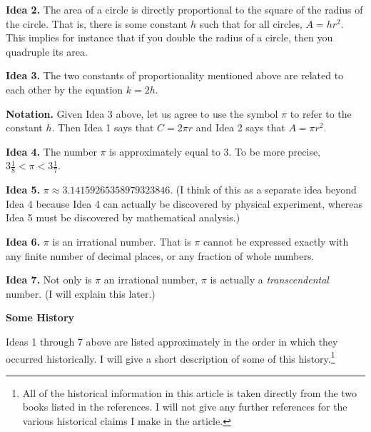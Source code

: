 \documentclass[twoside,twocolumn,12pt]{amsart}
\theoremstyle{plain}
\theoremstyle{definition}
\newcommand{\skipsmall}{\vspace{1em}}
\begin{document}
\vspace{0.1in}

\noindent
\textbf{Idea 2.} The area of a circle is directly proportional to the square
of the radius of the circle. That is, there is some constant $h$ such
that for all circles,
$A=h r^2$.  This implies for instance that if you double the radius
of a circle, then you quadruple its area.

\vspace{0.1in}

\noindent
\textbf{Idea 3.} The two constants of proportionality mentioned above
are related to each other by the equation  $k=2 h$.

\vspace{0.1in}

\noindent
\textbf{Notation.}
Given Idea 3 above,
let us agree to use the
symbol $\pi$ to refer to the constant $h$. Then Idea 1 says that
$C=2\pi r$ and Idea 2 says that $A=\pi r^2$.

\vspace{0.1in}

\noindent
\textbf{Idea 4.} The number $\pi$ is approximately equal to 3. To be
more precise, $3\frac{1}{8}<\pi<3\frac{1}{7}$.

\vspace{0.1in}

\noindent
\textbf{Idea 5.} $\pi\approx 3.14159265358979323846$. (I think of this as a
separate idea beyond Idea 4 because Idea 4
can actually be discovered by physical experiment, whereas Idea 5 must be
discovered by mathematical analysis.)

\vspace{0.1in}

\noindent
\textbf{Idea 6.} $\pi$ is an irrational number. That is $\pi$ cannot
be expressed exactly
with any finite number of decimal places, or any fraction
of whole numbers.

\vspace{0.1in}

\noindent
\textbf{Idea 7.} Not only is $\pi$ an irrational number, $\pi$ is actually
a \emph{transcendental} number. (I will explain this later.)

\newpage

\noindent
\textbf{\large Some History}

\skipsmall

Ideas 1 through 7 above are listed approximately in the order in
which they occurred historically. I will give a short description of some
of this history.\footnote{All of the historical information in this
article is taken directly from
the two books listed in the references. I will not give any further
references for the various historical claims I make in the article.}
\end{document}
